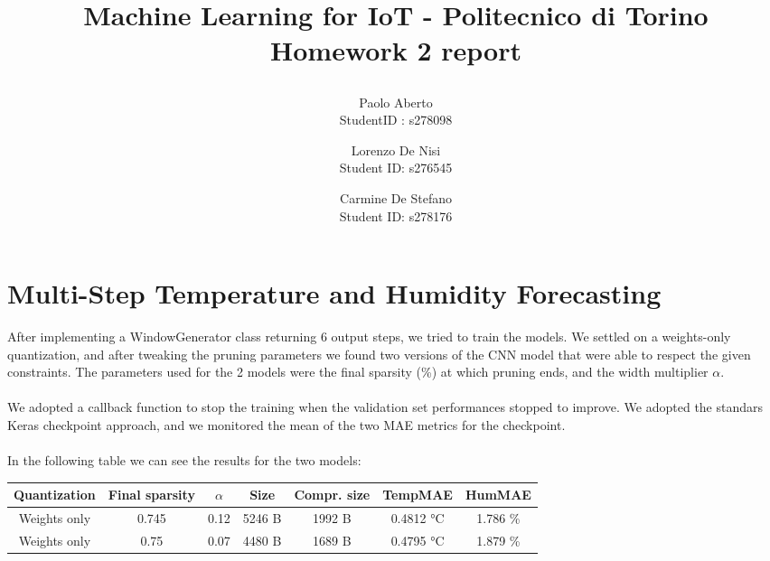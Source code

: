 \documentclass{article}
\date{}
\begin{document}
\author{Paolo Aberto\\
StudentID : s278098\\

\and
Lorenzo De Nisi\\
Student ID: s276545\\

\and
Carmine De Stefano\\
Student ID: s278176\\
}

\justifying

\title{
    \vspace{.5cm}
    
    Machine Learning for IoT - 
    Politecnico di Torino\\
    \vspace{1cm}
    \Large \textbf{Homework 2 report}
    \vspace{.5cm}
}

\maketitle
\thispagestyle{empty} 
\vspace{-0.5cm}


\section{Multi-Step Temperature and Humidity Forecasting}
After implementing a WindowGenerator class returning 6 output steps, we tried to train the models. We settled on a weights-only quantization, and after tweaking the pruning parameters we found two versions of the CNN model that were able to respect the given constraints.
The parameters used for the 2 models were the final sparsity (\%) at which pruning ends, and the width multiplier $\alpha$.
\\\\
We adopted a callback function to stop the training when the validation set performances stopped to improve. We adopted the standars Keras checkpoint approach, and we monitored the mean of the two MAE metrics for the checkpoint. 
\\\\
In the following table we can see the results for the two models:

\vspace{0.2cm}

\begin{center}
\begin{tabular}{ |c|c|c|c|c|c|c| } 
\hline
\textbf{Quantization} & \textbf{Final sparsity} & \textbf{$\alpha$} &\textbf{Size} &\textbf{Compr. size} &\textbf{TempMAE}&\textbf{HumMAE} \\
\hline
Weights only & 0.745 & 0.12 & 5246 B & 1992 B & 0.4812 °C & 1.786 \% \\ 
Weights only & 0.75  & 0.07 & 4480 B & 1689 B & 0.4795 °C & 1.879 \% \\ 
\hline

\end{tabular}

\end{center}
\end{document}
